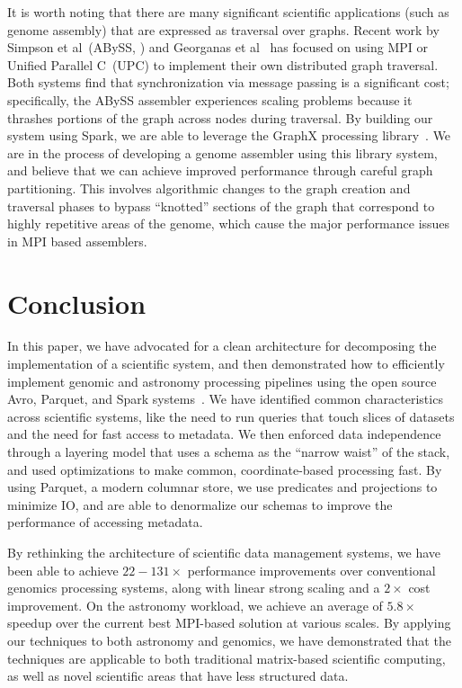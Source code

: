 \documentclass{acm_proc_article-sp}
\begin{document}
It is worth noting that there are many significant scientific applications (such as genome
assembly) that are expressed as traversal over graphs. Recent work by Simpson et al~(ABySS,
\cite{simpson09}) and Georganas et al~\cite{georganas14} has focused on using MPI
or Unified Parallel C~(UPC) to implement their own distributed graph traversal. Both systems
find that synchronization via message passing is a significant cost; specifically, the ABySS assembler
experiences scaling problems because it thrashes portions of the graph across nodes during traversal.
By building our system using Spark, we are able to leverage the GraphX processing library~\cite{xin13,
gonzalez14}. We are in the process of developing a genome assembler using this library system, and
believe that we can achieve improved performance through careful graph partitioning. This involves
algorithmic changes to the graph creation and traversal phases to bypass ``knotted'' sections of the
graph that correspond to highly repetitive areas of the genome, which cause the major performance
issues in MPI based assemblers.

\section{Conclusion}
\label{sec:conclusion}

In this paper, we have advocated for a clean architecture for decomposing the implementation of a scientific
system, and then demonstrated how to efficiently implement genomic and astronomy processing pipelines using
the open source Avro, Parquet, and Spark systems~\cite{avro, parquet, zaharia10}. We have identified common
characteristics across scientific systems, like the need to run queries that touch slices of datasets and the need
for fast access to metadata. We then enforced data independence through a layering model that uses a schema
as the ``narrow waist'' of the stack, and used optimizations to make common, coordinate-based processing
fast. By using Parquet, a modern columnar store, we use predicates and projections to minimize IO, and are able
to denormalize our schemas to improve the performance of accessing metadata.

By rethinking the architecture of scientific data management systems, we have been able to achieve
$22-131\times$ performance improvements over conventional genomics processing systems, along with linear
strong scaling and a $2\times$ cost improvement. On the astronomy workload, we achieve an average of
$5.8\times$ speedup over the current best MPI-based solution at various scales. By applying our techniques
to both astronomy and genomics, we have demonstrated that the techniques are applicable to both traditional
matrix-based scientific computing, as well as novel scientific areas that have less structured data.
\end{document}
